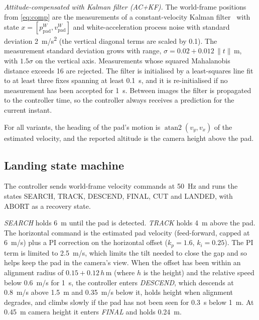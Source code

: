 \documentclass[conference]{IEEEtran}
\begin{document}
\emph{Attitude-compensated with Kalman filter (AC+KF).} The world-frame positions from
\eqref{eq:comp} are the measurements of a constant-velocity Kalman filter~\cite{kalman1960new}
with state $x = [p^{W}_{\text{pad}}, v^{W}_{\text{pad}}]$ and white-acceleration process noise
with standard deviation \SI{2}{m/s^2} (the vertical diagonal terms are scaled by 0.1). The
measurement standard deviation grows with range,
$\sigma = 0.02 + 0.012\,\lVert t \rVert$\,m, with $1.5\sigma$ on the vertical axis.
Measurements whose squared Mahalanobis distance exceeds 16 are rejected. The filter is
initialised by a least-squares line fit to at least three fixes spanning at least
\SI{0.1}{s}, and it is re-initialised if no measurement has been accepted for \SI{1}{s}.
Between images the filter is propagated to the controller time, so the controller always
receives a prediction for the current instant.

For all variants, the heading of the pad's motion is $\operatorname{atan2}(v_y, v_x)$ of the
estimated velocity, and the reported altitude is the camera height above the pad.

\subsection{Landing state machine}
The controller sends world-frame velocity commands at \SI{50}{Hz} and runs the states
SEARCH, TRACK, DESCEND, FINAL, CUT and LANDED, with ABORT as a recovery state.

\emph{SEARCH} holds \SI{6}{m} until the pad is detected. \emph{TRACK} holds \SI{4}{m} above the
pad. The horizontal command is the estimated pad velocity (feed-forward, capped at
\SI{6}{m/s}) plus a PI correction on the horizontal offset ($k_p=1.6$, $k_i=0.25$). The PI
term is limited to \SI{2.5}{m/s}, which limits the tilt needed to close the gap and so helps
keep the pad in the camera's view. When the offset has been within an alignment radius of
$0.15 + 0.12\,h$\,m (where $h$ is the height) and the relative speed below \SI{0.6}{m/s} for
\SI{1}{s}, the controller enters \emph{DESCEND}, which descends at \SI{0.8}{m/s} above
\SI{1.5}{m} and \SI{0.35}{m/s} below it, holds height when alignment degrades, and climbs
slowly if the pad has not been seen for \SI{0.3}{s} below \SI{1}{m}. At \SI{0.45}{m} camera
height it enters \emph{FINAL} and holds \SI{0.24}{m}.
\end{document}
